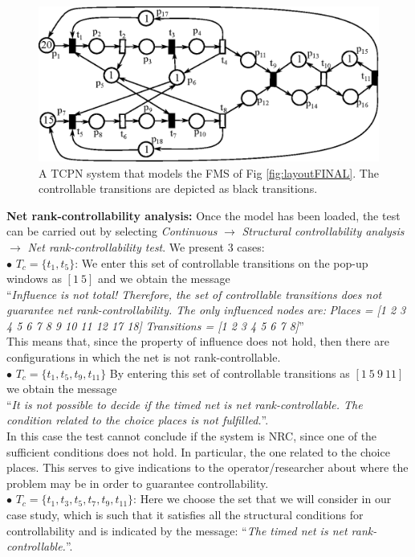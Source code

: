 \begin{figure}[htbp]
    \centering
    \includegraphics[scale=.75]{figs/FMS.eps}
    \caption{A TCPN system that models the FMS of Fig \ref{fig:layoutFINAL}. The controllable transitions are depicted as black transitions.}
    \label{fig:FMSPN}
\end{figure}

\textbf{Net rank-controllability analysis:} Once the model has been loaded, the test can be carried out by selecting \textit{Continuous} $\rightarrow$ \textit{Structural controllability analysis} $\rightarrow$ \textit{Net rank-controllability test}. We present 3 cases:\\
${\bullet}$ $T_c = \{t_1,t_5\}$: We enter this set of controllable transitions on the pop-up windows as $[1 \ 5]$ and we obtain the message \\``\textit{Influence is not total! Therefore, the set of controllable transitions does not guarantee net rank-controllability. The only influenced nodes are:}
\textit{Places = [1 2 3 4 5 6 7 8 9 10 11 12 17 18]}
\textit{Transitions = [1 2 3 4 5 6 7 8]}'' \\This means that, since the property of influence does not hold, then there are configurations in which the net is not rank-controllable.\\
${\bullet}$ $T_c = \{t_1,t_5,t_9,t_{11}\}$ By entering this set of controllable transitions as $[1 \ 5 \ 9 \ 11]$ we obtain the message \\``\textit{It is not possible to decide if the timed net is net rank-controllable. The condition related to the choice places is not fulfilled.}''. \\In this case the test cannot conclude if the system is NRC, since one of the sufficient conditions does not hold. In particular, the one related to the choice places. This serves to give indications to the operator/researcher about where the problem may be in order to guarantee controllability.\\
${\bullet}$ $T_c = \{t_1,t_3,t_5,t_7,t_9,t_{11}\}$: Here we choose the set that we will consider in our case study, which is such that it satisfies all the structural conditions for controllability and is indicated by the message:
``\textit{The timed net is net rank-controllable.}''.

